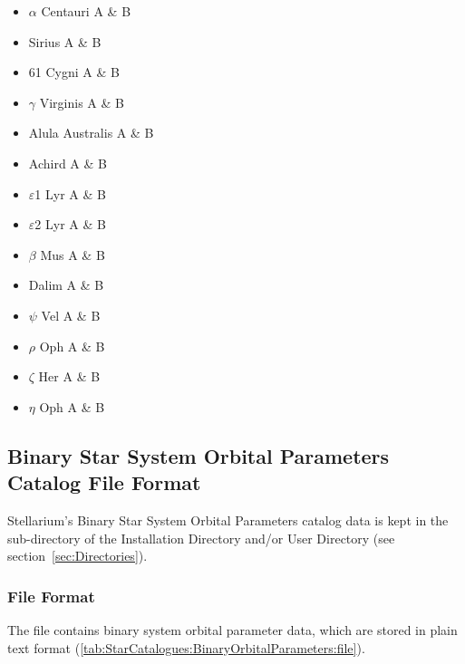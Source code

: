 \begin{itemize}
	\item $\alpha$ Centauri A \& B
	\item Sirius A \& B
	\item 61 Cygni A \& B
	\item $\gamma$ Virginis A \& B
	\item Alula Australis A \& B
	\item Achird A \& B
	\item $\varepsilon$1 Lyr A \& B
	\item $\varepsilon$2 Lyr A \& B
	\item $\beta$ Mus A \& B
	\item Dalim A \& B
	\item $\psi$ Vel A \& B
	\item $\rho$ Oph A \& B
	\item $\zeta$ Her A \& B
	\item $\eta$ Oph A \& B
\end{itemize}

\subsection{Binary Star System Orbital Parameters Catalog File Format}
\label{sec:StarCatalogues:BinaryOrbitalParameters:format}

Stellarium's Binary Star System Orbital Parameters catalog data is kept
in the  sub-directory of the Installation Directory and/or User Directory (see section~\ref{sec:Directories}).

\subsubsection{File Format}
\label{sec:StarCatalogues:BinaryOrbitalParameters:file}

The file  contains binary system orbital parameter data, which are stored in 
plain text format (\ref{tab:StarCatalogues:BinaryOrbitalParameters:file}).

